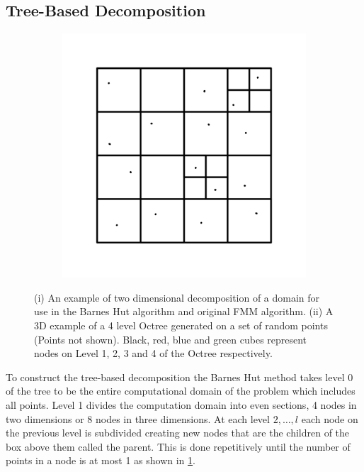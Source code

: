 \subsection{Tree-Based Decomposition} \label{sec:TreeDecomp}

\begin{figure}
    \begin{subfigure}[b]{0.44\textwidth}
        \centering
        \includegraphics[width=\textwidth]{Images/KIFMM/Decomposition.pdf}
        \caption{\label{fig:2DDecompostion}}
    \end{subfigure}
    \hfill
    \begin{subfigure}[b]{0.44\textwidth}
    \centering
        \resizebox{\linewidth}{!}{}
        \caption{\label{fig:Decompostionexample}}
    \end{subfigure}
    \caption[Decomposition of Domain in 2D and 3D]{(i) An example of two dimensional decomposition of a domain for use in the Barnes Hut algorithm and original FMM algorithm. (ii) A 3D example of a 4 level Octree generated on a set of random points (Points not shown). Black, red, blue and green cubes represent nodes on Level 1, 2, 3 and 4 of the Octree respectively.}
\end{figure}

To construct the tree-based decomposition the Barnes Hut method takes level 0 of the tree to be the entire computational domain of the problem which includes all points. Level 1 divides the computation domain into even sections, 4 nodes in two dimensions or 8 nodes in three dimensions. At each level $2,\dots,l$ each node on the previous level is subdivided creating new nodes that are the children of the box above them called the parent. This is done repetitively until the number of points in a node is at most 1 as shown in \cref{fig:2DDecompostion}.

